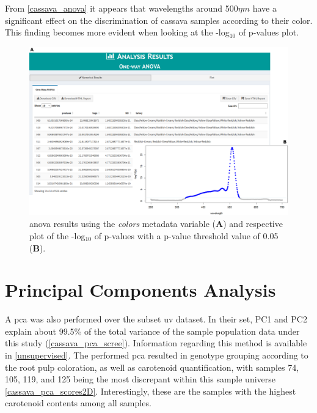 From \autoref{cassava_anova} it appears that wavelengths around 500$\eta m$ have a significant effect on the discrimination of cassava samples according to their color. This finding becomes more evident when looking at the -log$_{10}$ of p-values plot.

\begin{figure}[H]
	\centering
	\includegraphics[width=1\linewidth]{Imagens/Case_study/anova_table_plot}
	\caption{\gls{anova} results using the \textit{colors} metadata variable (\textbf{A}) and respective plot of the -log$_{10}$ of p-values with a p-value threshold value of 0.05 (\textbf{B}).}
	\label{cassava_anova}
\end{figure}




\section{Principal Components Analysis}

A \gls{pca} was also performed over the subset \gls{uv} dataset. In their set, PC1 and PC2 explain about 99.5\% of the total variance of the sample population data under this study (\autoref{cassava_pca_scree}). Information regarding this method is available in \autoref{unsupervised}. The performed \gls{pca} resulted in genotype grouping according to the root pulp coloration, as well as carotenoid quantification, with samples 74, 105, 119, and 125 being the most discrepant within this sample universe \autoref{cassava_pca_scores2D}. Interestingly, these are the samples with the highest carotenoid contents among all samples. 

